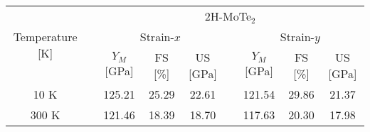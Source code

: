 \documentclass[a4paper,fleqn]{cas-sc}
\begin{document}
\begin{table*}[]
		\begin{tabular}{clccclccc}
			\hline
			\multicolumn{1}{c}{\multirow{3}{*}{Temperature [K]}} & \multicolumn{1}{l}{} &                                                                                                      \multicolumn{7}{c}{2H-MoTe$_2$}                                                                                                      \\ \cline{3-9}
			                  \multicolumn{1}{c}{}                   & \multicolumn{1}{l}{} &                                     \multicolumn{3}{c}{ Strain-$x$}                                      & \multicolumn{1}{l}{} &                                      \multicolumn{3}{c}{Strain-$y$}                                      \\ \cline{3-5}\cline{7-9}
			                  \multicolumn{1}{c}{}                   & \multicolumn{1}{l}{} & \multicolumn{1}{c}{$Y_M$ {[}GPa{]}} & \multicolumn{1}{c}{FS {[}\%{]}} & \multicolumn{1}{c}{US {[}GPa{]}} & \multicolumn{1}{l}{} & \multicolumn{1}{c}{$Y_M$ {[}GPa{]}} & \multicolumn{1}{c}{FS {[}\%{]}} & \multicolumn{1}{c}{US {[}GPa{]}} \\ \cline{1-1}\cline{3-5}\cline{7-9}
			                          10 K                            &                      &               125.21                &              25.29              &              22.61               &                      &               121.54                &              29.86              &              21.37               \\
			                \multicolumn{1}{c}{300 K}                 & \multicolumn{1}{l}{} &     \multicolumn{1}{c}{121.46}      &    \multicolumn{1}{c}{18.39}    &    \multicolumn{1}{c}{18.70}     & \multicolumn{1}{l}{} &     \multicolumn{1}{c}{117.63}      &    \multicolumn{1}{c}{20.30}    &    \multicolumn{1}{c}{17.98}
		\end{tabular}
	

\end{table*}
\end{document}
